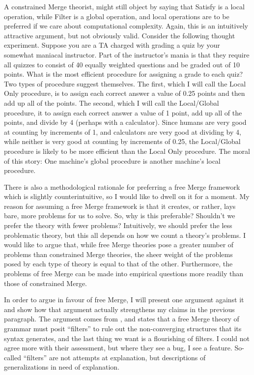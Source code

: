 \documentclass[MilwayThesis]{subfiles}
\begin{document}
A constrained Merge theorist, might still object by saying that Satisfy is a local operation, while Filter is a global operation, and local operations are to be preferred if we care about computational complexity.
Again, this is an intuitively attractive argument, but not obviously valid.
Consider the following thought experiment.
Suppose you are a TA charged with grading a quiz by your somewhat maniacal instructor.
Part of the instructor's mania is that they require all quizzes to consist of 40 equally weighted questions and be graded out of 10 points.
What is the most efficient procedure for assigning a grade to each quiz?
Two types of procedure suggest themselves.
The first, which I will call the Local Only procedure, is to assign each correct answer a value of 0.25 points and then add up all of the points.
The second, which I will call the Local/Global procedure, it to assign each correct answer a value of 1 point, add up all of the points, and divide by 4 (perhaps with a calculator).
Since humans are very good at counting by increments of 1, and calculators are very good at dividing by 4, while neither is very good at counting by increments of 0.25, the Local/Global procedure is likely to be more efficient than the Local Only procedure.
The moral of this story: One machine's global procedure is another machine's local procedure.

There is also a methodological rationale for preferring a free Merge framework which is slightly counterintuitive, so I would like to dwell on it for a moment.
My reason for assuming a free Merge framework is that it creates, or rather, lays bare, more problems for us to solve.
So, why is this preferable?
Shouldn't we prefer the theory with fewer problems?
Intuitively, we should prefer the less problematic theory, but this all depends on how we count a theory's problems.
I would like to argue that, while free Merge theories pose a greater number of problems than constrained Merge theories, the sheer weight of the problems posed by each type of theory is equal to that of the other.
Furthermore, the problems of free Merge can be made into empirical questions more readily than those of constrained Merge.

In order to argue in favour of free Merge, I will present one argument against it and show how that argument actually strengthens my claims in the previous paragraph.
The argument comes from \textcite{frampton2008crash}, and states that a free Merge theory of grammar must posit ``filters'' to rule out the non-converging structures that its syntax generates, and the last thing we want is a flourishing of filters.
I could not agree more with their assessment, but where they see a bug, I see a feature.
So-called ``filters'' are not attempts at explanation, but descriptions of generalizations in need of explanation.
\end{document}
